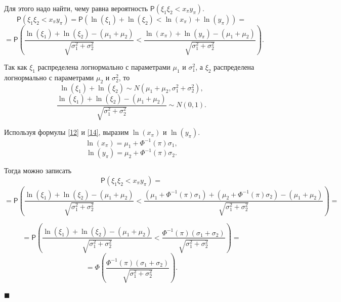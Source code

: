\documentclass[12pt]{article}
\newenvironment{Proof}{\par\noindent{\bf Доказательство.}}{\hfill$\scriptstyle\blacksquare$}
\begin{document}
\begin{Proof}
		Для этого надо найти, чему равна вероятность $\mathsf{P}(\xi_{1}\xi_{2}< x_{\pi}y_{\pi})$.
		\begin{equation*}
			\mathsf{P}(\xi_{1}\xi_{2}< x_{\pi}y_{\pi}) = \mathsf{P}(\ln(\xi_{1})+\ln(\xi_{2})<\ln(x_{\pi})+\ln(y_{\pi}))=
		\end{equation*}
		\begin{equation*}
			=\mathsf{P}\left(\displaystyle{\frac{\ln(\xi_{1})+\ln(\xi_{2})-(\mu_{1}+\mu_{2})}{\sqrt{\sigma_{1}^{2}+\sigma_{2}^{2}}}}<\displaystyle{\frac{\ln(x_{\pi})+\ln(y_{\pi})-(\mu_{1}+\mu_{2})}{\sqrt{\sigma_{1}^{2}+\sigma_{2}^{2}}}}\right).
		\end{equation*}
		
		Так как $\xi_{1}$ распределена логнормально с параметрами $\mu_{1}$ и $\sigma_{1}^{2}$, а $\xi_{2}$ распределена логнормально с параметрами $\mu_{2}$ и $\sigma_{2}^{2}$, то
		\begin{equation*} 
			\ln(\xi_{1})+\ln(\xi_{2})\sim N(\mu_{1}+\mu_{2}, \sigma_{1}^{2}+\sigma_{2}^{2}),
		\end{equation*}
		\begin{equation*}
			\frac{\ln(\xi_{1})+\ln(\xi_{2})-(\mu_{1}+\mu_{2})}{\sqrt{\sigma_{1}^{2}+\sigma_{2}^{2}}} \sim N(0,1).
		\end{equation*}
		
		Используя формулы \eqref{12} и \eqref{14}, выразим $\ln(x_{\pi})$ и $\ln(y_{\pi})$.
		\begin{equation*}
			\ln(x_{\pi})=\mu_{1}+\Phi^{-1}(\pi)\sigma_{1},
		\end{equation*}
		\begin{equation*}
			\ln(y_{\pi})=\mu_{2}+\Phi^{-1}(\pi)\sigma_{2}.
		\end{equation*}
		
		Тогда можно записать
		\begin{equation*}
			\mathsf{P}(\xi_{1}\xi_{2}< x_{\pi}y_{\pi}) =
		\end{equation*}
		\begin{equation*}
			=\mathsf{P}\left(\displaystyle{\frac{\ln(\xi_{1})+\ln(\xi_{2})-(\mu_{1}+\mu_{2})}{\sqrt{\sigma_{1}^{2}+\sigma_{2}^{2}}}}<\displaystyle{\frac{(\mu_{1}+\Phi^{-1}(\pi)\sigma_{1})+(\mu_{2}+\Phi^{-1}(\pi)\sigma_{2})-(\mu_{1}+\mu_{2})}{\sqrt{\sigma_{1}^{2}+\sigma_{2}^{2}}}}\right)=
		\end{equation*}
		
		\begin{equation*}
			=\mathsf{P}\left(\displaystyle{\frac{\ln(\xi_{1})+\ln(\xi_{2})-(\mu_{1}+\mu_{2})}{\sqrt{\sigma_{1}^{2}+\sigma_{2}^{2}}}}<\displaystyle{\frac{\Phi^{-1}(\pi)(\sigma_{1}+\sigma_{2})}{\sqrt{\sigma_{1}^{2}+\sigma_{2}^{2}}}}\right)=
		\end{equation*}
		\begin{equation*}
			=\Phi\left(\frac{\Phi^{-1}(\pi)(\sigma_{1}+\sigma_{2})}{\sqrt{\sigma_{1}^{2}+\sigma_{2}^{2}}}\right).
		\end{equation*}
		

\end{Proof}
\end{document}
